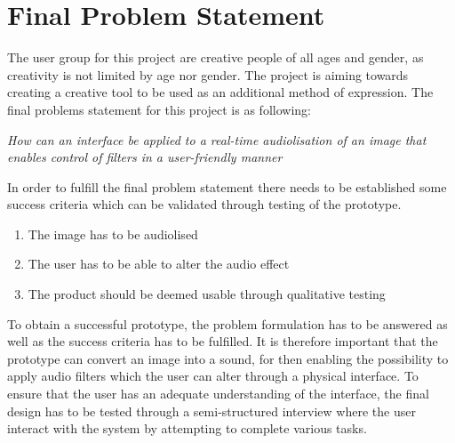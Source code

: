 \chapter{Final Problem Statement}\label{ch:finalproblem}

The user group for this project are creative people of all ages and gender, as creativity is not limited by age nor gender. The project is aiming towards creating a creative tool to be used as an additional method of expression. 
The final problems statement for this project is as following:



\textit{How can an interface be applied to a real-time audiolisation of an image that enables control of filters in a user-friendly manner}



In order to fulfill the final problem statement there needs to be established some success criteria which can be validated through testing of the prototype. 
\begin{enumerate}
\item The image has to be audiolised 
\item The user has to be able to alter the audio effect 
\item The product should be deemed usable through qualitative testing
\end{enumerate}

To obtain a successful prototype, the problem formulation has to be answered as well as the success criteria has to be fulfilled. It is therefore important that the prototype can convert an image into a sound, for then enabling the possibility to apply audio filters which the user can alter through a physical interface. To ensure that the user has an adequate understanding of the interface, the final design has to be tested through a semi-structured interview where the user interact with the system by attempting  to complete various tasks. 